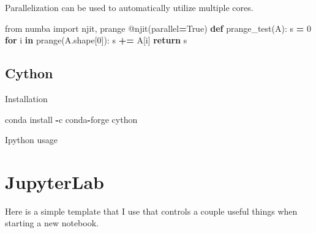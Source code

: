 \documentclass[]{book}
\newenvironment{Shaded}{\begin{snugshade}}{\end{snugshade}}
\newcommand{\KeywordTok}[1]{\textcolor[rgb]{0.13,0.29,0.53}{\textbf{#1}}}
\newcommand{\DecValTok}[1]{\textcolor[rgb]{0.00,0.00,0.81}{#1}}
\newcommand{\ImportTok}[1]{#1}
\newcommand{\VariableTok}[1]{\textcolor[rgb]{0.00,0.00,0.00}{#1}}
\newcommand{\ControlFlowTok}[1]{\textcolor[rgb]{0.13,0.29,0.53}{\textbf{#1}}}
\newcommand{\OperatorTok}[1]{\textcolor[rgb]{0.81,0.36,0.00}{\textbf{#1}}}
\newcommand{\BuiltInTok}[1]{#1}
\newcommand{\AttributeTok}[1]{\textcolor[rgb]{0.77,0.63,0.00}{#1}}
\newcommand{\NormalTok}[1]{#1}
\begin{document}
Parallelization can be used to automatically utilize multiple cores.

\begin{Shaded}
\begin{Highlighting}[]
\ImportTok{from}\NormalTok{ numba }\ImportTok{import}\NormalTok{ njit, prange}
\AttributeTok{@njit}\NormalTok{(parallel}\OperatorTok{=}\VariableTok{True}\NormalTok{)}
\KeywordTok{def}\NormalTok{ prange_test(A):}
\NormalTok{    s }\OperatorTok{=} \DecValTok{0}
    \ControlFlowTok{for}\NormalTok{ i }\KeywordTok{in}\NormalTok{ prange(A.shape[}\DecValTok{0}\NormalTok{]):}
\NormalTok{        s }\OperatorTok{+=}\NormalTok{ A[i]}
    \ControlFlowTok{return}\NormalTok{ s}
\end{Highlighting}
\end{Shaded}

\section{Cython}\label{cython}

Installation

\begin{Shaded}
\begin{Highlighting}[]
\NormalTok{conda install }\OperatorTok{-}\NormalTok{c conda}\OperatorTok{-}\NormalTok{forge cython}
\end{Highlighting}
\end{Shaded}

Ipython usage

\begin{Shaded}
\end{Shaded}

\chapter{JupyterLab}\label{jupyter}

Here is a simple template that I use that controls a couple useful
things when starting a new notebook.
\end{document}
